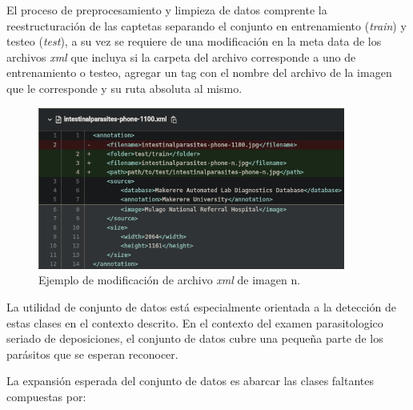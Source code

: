 \documentclass[letter,12pt]{report}
\begin{document}
El proceso de preprocesamiento y limpieza de datos comprente la reestructuración de las
captetas separando el conjunto en entrenamiento (\textit{train}) y testeo (\textit{test}),
a su vez se requiere de una modificación en la meta data de los archivos \textit{xml}
que incluya si la carpeta del archivo corresponde a uno de entrenamiento o testeo, agregar
un tag con el nombre del archivo de la imagen que le corresponde y su ruta absoluta al mismo.

\begin{figure}[ht]
    \centering
    \includegraphics[width=0.9\textwidth]{diff}
    \caption{Ejemplo de modificación de archivo \textit{xml} de imagen n.}
    \label{fig:diff}
\end{figure}

La utilidad de conjunto de datos está especialmente orientada a la detección de estas clases
en el contexto descrito. En el contexto del examen parasitologico seriado de deposiciones,
el conjunto de datos cubre una pequeña parte de los parásitos que se esperan reconocer.

La expansión esperada del conjunto de datos es abarcar las clases faltantes compuestas por:
\end{document}

